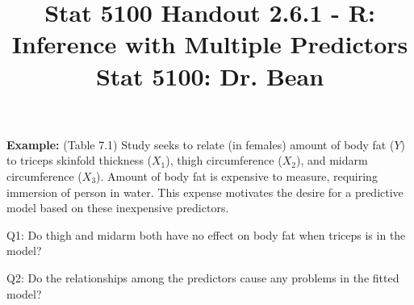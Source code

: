 \documentclass{article}\usepackage[]{graphicx}\usepackage[]{color}
\begin{document}
\title{%
  Stat 5100 Handout 2.6.1 - R: Inference with Multiple Predictors \\
  \smallskip
  \large Stat 5100: Dr. Bean
}
\date{}

\maketitle

\textbf{Example: } (Table 7.1) Study seeks to relate (in females) amount of body fat ($Y$) to triceps skinfold thickness ($X_1$), thigh circumference ($X_2$), and midarm circumference ($X_3$).  Amount of body fat is expensive to measure, requiring immersion of person in water.  This expense motivates the desire for a predictive model based on these inexpensive predictors.

Q1: Do thigh and midarm both have no effect on body fat when triceps is in the model?

Q2: Do the relationships among the predictors cause any problems in the fitted model?
\end{document}
